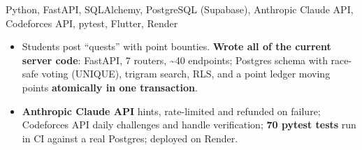{}
{Python, FastAPI, SQLAlchemy, PostgreSQL (Supabase), Anthropic Claude API, Codeforces API, pytest, Flutter, Render}
{\begin{itemize}
  \item Students post ``quests'' with point bounties. \textbf{Wrote all of the current server code}: FastAPI, 7 routers, \textasciitilde40 endpoints; Postgres schema with race-safe voting (UNIQUE), trigram search, RLS, and a point ledger moving points \textbf{atomically in one transaction}.
  \item \textbf{Anthropic Claude API} hints, rate-limited and refunded on failure; Codeforces API daily challenges and handle verification; \textbf{70 pytest tests} run in CI against a real Postgres; deployed on Render.
\end{itemize}}
